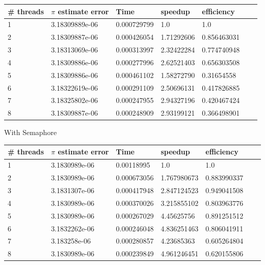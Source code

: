 \documentclass[11pt,epsfig,letterpaper]{article}
\begin{document}
\begin{enumerate}
\begin{center}
            \begin{tabular}{ | l | l | l | l | l | l | p{10cm} |}
            \hline
            \# threads & $\pi$ estimate error & Time & speedup & efficiency \\ \hline
            1 & 3.18309889e-06 & 0.000729799 & 1.0        & 1.0         \\ \hline
            2 & 3.18309887e-06 & 0.000426054 & 1.71292606 & 0.856463031 \\ \hline
            3 & 3.18313069e-06 & 0.000313997 & 2.32422284 & 0.774740948 \\ \hline
            4 & 3.18309886e-06 & 0.000277996 & 2.62521403 & 0.656303508 \\ \hline
            5 & 3.18309886e-06 & 0.000461102 & 1.58272790 & 0.31654558  \\ \hline
            6 & 3.18322619e-06 & 0.000291109 & 2.50696131 & 0.417826885 \\ \hline
            7 & 3.18325802e-06 & 0.000247955 & 2.94327196 & 0.420467424 \\ \hline
            8 & 3.18309887e-06 & 0.000248909 & 2.93199121 & 0.366498901 \\ \hline
            \end{tabular}
            \vspace{1pc}
            \pagebreak

            With Semaphore

            \vspace{0.5pc}
            \begin{tabular}{ | l | l | l | l | l | l | p{10cm} |}
            \hline
            \# threads & $\pi$ estimate error & Time & speedup & efficiency \\ \hline
            1 & 3.1830989e-06 & 0.00118995  &  1.0        & 1.0         \\ \hline
            2 & 3.1830989e-06 & 0.000673056 &  1.767980673& 0.883990337 \\ \hline
            3 & 3.1831307e-06 & 0.000417948 &  2.847124523& 0.949041508 \\ \hline
            4 & 3.1830989e-06 & 0.000370026 &  3.215855102& 0.803963776 \\ \hline
            5 & 3.1830989e-06 & 0.000267029 &  4.45625756 & 0.891251512 \\ \hline
            6 & 3.1832262e-06 & 0.000246048 &  4.836251463& 0.806041911 \\ \hline
            7 & 3.183258e-06  & 0.000280857 &  4.23685363 & 0.605264804 \\ \hline
            8 & 3.1830989e-06 & 0.000239849 &  4.961246451& 0.620155806 \\ \hline
            \end{tabular}
            \vspace{0.5pc}


\end{center}
\end{enumerate}
\end{document}
